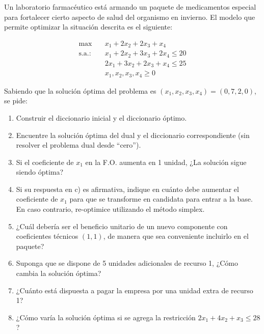 \documentclass[12pt]{article}
\theoremstyle{plain}
\begin{document}
Un laboratorio farmacéutico está armando un paquete de medicamentos especial para
fortalecer cierto aspecto de salud del organismo en invierno. El modelo que permite
optimizar la situación descrita es el siguiente:

\[
      \begin{aligned}
            \max\quad         & x_1 + 2x_2 + 2x_3 + x_4          \\
            \text{s.a.:}\quad & x_1 + 2x_2 + 3x_3 + 2x_4 \leq 20 \\
                              & 2x_1 + 3x_2 + 2x_3 + x_4 \leq 25 \\
                              & x_1, x_2, x_3, x_4 \geq 0
      \end{aligned}
\]

Sabiendo que la solución óptima del problema es $(x_1, x_2, x_3, x_4) = (0, 7, 2, 0)$,
se pide:

\begin{enumerate}[label=\alph*)]
      \item Construir el diccionario inicial y el diccionario óptimo.

      \item Encuentre la solución óptima del dual y el diccionario correspondiente (sin
            resolver el problema dual desde ``cero'').

      \item Si el coeficiente de $x_1$ en la F.O. aumenta en 1 unidad, ¿La solución sigue
            siendo óptima?

      \item Si su respuesta en c) es afirmativa, indique en cuánto debe aumentar el
            coeficiente de $x_1$ para que se transforme en candidata para entrar a la base.
            En caso contrario, re-optimice utilizando el método simplex.

      \item ¿Cuál debería ser el beneficio unitario de un nuevo componente con coeficientes
            técnicos $(1,1)$, de manera que sea conveniente incluirlo en el paquete?

      \item Suponga que se dispone de 5 unidades adicionales de recurso 1, ¿Cómo cambia
            la solución óptima?

      \item ¿Cuánto está dispuesta a pagar la empresa por una unidad extra de recurso 1?

      \item ¿Cómo varía la solución óptima si se agrega la restricción
            $2x_1 + 4x_2 + x_3 \leq 28$?
\end{enumerate}
\end{document}
